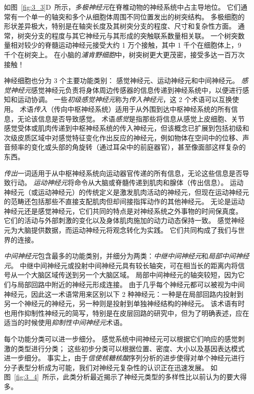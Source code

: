 如图~\ref{fig:3_3}D~所示，\textit{多极神经元}在脊椎动物的神经系统中占主导地位。 
它们通常有一个单一的轴突和多个从细胞体周围不同位置发出的树突结构。
多极细胞的形状差异极大，特别是在轴突长度及其树突分支的程度、尺寸和复杂性方面。 
通常，树突分支的程度与其它神经元与其形成的突触联系数量相关联。 
一个树突数量相对较少的脊髓运动神经元接受大约 1 万个接触，其中 1 千个在细胞体上，9 千个在树突上。
在小脑的\textit{浦肯野细胞}中，树突树更大更茂密，接受多达一百万次接触！


神经细胞也分为 3 个主要功能类别：
感觉神经元、运动神经元和中间神经元。 
\textit{感觉神经元}感觉神经元负责将身体周边传感器的信息传递到神经系统中，以便进行感知和运动协调。
一些\textit{初级感觉神经元}称为\textit{传入神经元}，这 2 个术语可以互换使用。
术语\textit{传入}（传向中枢神经系统）适用于从外围到达中枢神经系统的所有信息，无论该信息是否导致感觉。
术语\textit{感觉}是指那些将信息从感觉上皮细胞、关节感觉受体或肌肉传递到中枢神经系统的传入神经元，但该概念已扩展到包括初级和次级皮质区域中对感觉特征变化作出反应的神经元，例如物体在空间中的位移、声音频率的变化或头部的角旋转（通过耳朵中的前庭器官），甚至像面部这样复杂的东西。


\textit{传出}一词适用于从中枢神经系统向运动器官传递的所有信息，无论这些信息是否导致行动。
\textit{运动神经元}将命令从大脑或脊髓传递到肌肉和腺体（传出信息）。 
运动神经元（或运动神经元）的传统定义是激发肌肉活动的神经元，但现在运动神经元的范畴还包括那些不直接支配肌肉但却间接指挥动作的其他神经元。
无论是运动神经元还是感觉神经元，它们共同的特点是对神经系统之外事物的时间保真度。
它们的活动与外部刺激的变化以及身体肌肉施加的动力动态保持一致。	
感觉神经元为大脑提供数据，而运动神经元将观念转化为实践。 
它们共同构成了我们与世界的连接。


\textit{中间神经元}包含最多的功能类别，并细分为两类：\textit{中继中间神经元}和\textit{局部中间神经元}。
中继中间神经元或投射中间神经元具有较长轴突，可在相当长的距离内将信号从一个大脑区域传送到另一个大脑区域。
局部中间神经元的轴突较短，因为它们与局部回路中附近的神经元形成连接。
由于几乎每个神经元都可以被视为中间神经元，因此这一术语常用来区别以下 2 种神经元：一种是在局部回路内投射到另一个神经元的神经元，另一种则是投射到单独神经结构的神经元。
该术语有时也用作抑制性神经元的简写，特别是在皮层回路的研究中，但为了明确表述，应在适当的时候使用\textit{抑制性中间神经元}术语。


每个功能分类可以进一步细分。 
感觉系统中间神经元可以根据它们响应的感觉刺激的类型进行分类； 
这些初步分类可以根据位置、密度、大小以及基因表达模式进一步细分。
事实上，由于\textit{信使核糖核酸}序列分析的进步使得对单个神经元进行分子表型分析成为可能，我们对神经元复杂性的认识正在迅速发展。 
如图~\ref{fig:3_4}~所示，此类分析最近揭示了神经元类型的多样性比以前认为的要大得多。


